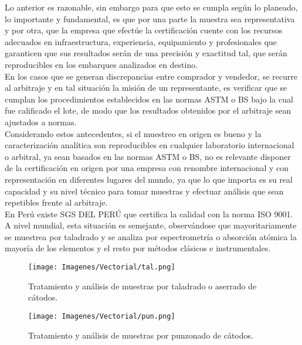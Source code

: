Lo anterior es razonable, sin embargo para que esto se cumpla seg\'un lo planeado, lo importante y fundamental, es que por una parte la muestra sea representativa y  por otra, que la empresa que efect\'ue la certificaci\'on cuente con los recursos adecuados en infraestructura, experiencia, equipamiento y profesionales que garanticen que sus resultados ser\'an de una precisi\'on y exactitud tal, que ser\'an reproducibles en los embarques analizados en destino.\\

En los casos que se generan discrepancias entre comprador y vendedor, se recurre al arbitraje y en tal situaci\'on la misi\'on de un representante, es verificar que se cumplan los procedimientos establecidos en las normas ASTM o BS bajo la cual fue calificado el lote, de modo que los resultados obtenidos por el arbitraje sean ajustados a normas.\\

Considerando  estos  antecedentes,  si  el  muestreo  en  origen  es  bueno  y  la caracterizaci\'on anal\'itica son reproducibles en cualquier laboratorio internacional o arbitral, ya sean  basados en las normas ASTM o BS, no es relevante disponer de la certificaci\'on en origen por una empresa con renombre internacional y con representaci\'on en diferentes lugares del mundo, ya que lo que importa es su real capacidad y su nivel t\'ecnico para tomar muestras y efectuar an\'alisis que sean repetibles frente al arbitraje.\\

En Per\'u existe SGS DEL PER\'U que certifica la calidad con la norma ISO 9001.\\

A nivel mundial, esta situaci\'on es semejante, observ\'andose que mayoritariamente se muestrea por taladrado y se analiza por espectrometr\'ia o absorci\'on at\'omica la mayor\'ia de los elementos y el resto por m\'etodos cl\'asicos e instrumentales.

\begin{figure}[H]
 \centering
 \texttt{[image: Imagenes/Vectorial/tal.png]}
 \caption{Tratamiento y an\'alisis de muestras por taladrado o aserrado de c\'atodos.}
 \label{fig:tal}
\end{figure}

\begin{figure}[H]
 \centering
 \texttt{[image: Imagenes/Vectorial/pun.png]}
 \caption{Tratamiento y an\'alisis de muestras por punzonado de c\'atodos.}
 \label{fig:pun}
\end{figure}

